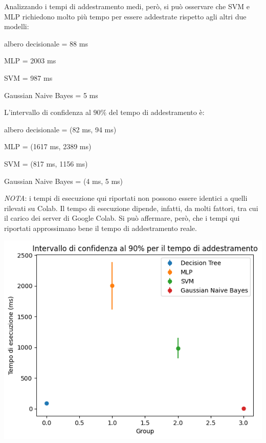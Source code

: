 Analizzando i tempi di addestramento medi, però, si può osservare che
SVM e MLP richiedono molto più tempo per essere addestrate rispetto
agli altri due modelli: \begin{itemize*}
    \item albero decisionale = 88 ms
    \item MLP = 2003 ms
    \item SVM = 987 ms
    \item Gaussian Naive Bayes = 5 ms
\end{itemize*}
L'intervallo di confidenza al $90\%$ del tempo di addestramento è: \begin{itemize*}
    \item albero decisionale = (82 ms, 94 ms)
    \item MLP = (1617 ms, 2389 ms)
    \item SVM = (817 ms, 1156 ms)
    \item Gaussian Naive Bayes = (4 ms, 5 ms)
\end{itemize*}

\textit{NOTA}: i tempi di esecuzione qui riportati non possono essere identici a quelli 
rilevati su Colab. 
Il tempo di esecuzione dipende, infatti, da molti fattori, tra cui il 
carico dei server di Google Colab. Si può affermare, però, che i tempi qui
riportati approssimano bene il tempo di addestramento reale.

\begin{Figure}
    \centering
    \includegraphics[width=\linewidth]{img/confidence_interval_time.png}
\end{Figure}


